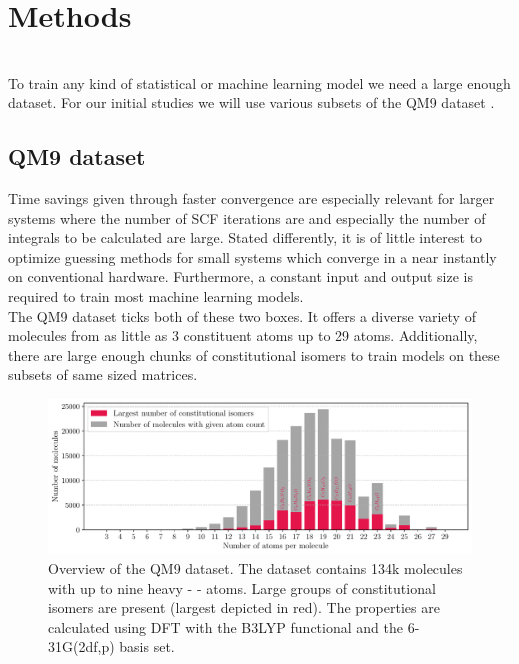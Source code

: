 \chapter{Methods}
\label{chap:methods}
\\
To train any kind of statistical or machine learning model we need a large enough dataset. For our initial studies we will use various subsets of the QM9 dataset \parencite{ref:article1_qm9, ref:article2_qm9}. 

\section{QM9 dataset \parencite{ref:data_qm9}}
\label{sec:qm9}
Time savings given through faster convergence are especially relevant for larger systems where the number of SCF iterations are and especially the number of integrals to be calculated are large. Stated differently, it is of little interest to optimize guessing methods for small systems which converge in a near instantly on conventional hardware. Furthermore, a constant input and output size is required to train most machine learning models. \\
The QM9 dataset \parencite{ref:article1_qm9,ref:article2_qm9} ticks both of these two boxes. It offers a diverse variety of molecules from as little as 3 constituent atoms up to 29 atoms. Additionally, there are large enough chunks of constitutional isomers to train models on these subsets of same sized matrices. 
\begin{figure}[H]
    \centering
    \includegraphics[width=\textwidth]{../fig/qm9_general/qm9_overview_stacked_bar.pdf}
    \caption[QM9 dataset overview]{Overview of the QM9 dataset. The dataset contains 134k molecules with up to nine heavy -     - atoms. Large groups of constitutional isomers are present (largest depicted in red). The properties are calculated using DFT with the B3LYP functional and the 6-31G(2df,p) basis set.}
    \label{fig:method_qm9_overview}
\end{figure}



